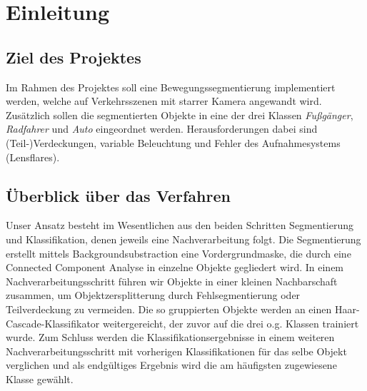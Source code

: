 \documentclass[conference]{IEEEtran}
\begin{document}

%
\IEEEpeerreviewmaketitle


\section{Einleitung}

 


\subsection{Ziel des Projektes}
Im Rahmen des Projektes soll eine Bewegungssegmentierung implementiert werden, welche auf Verkehrsszenen mit starrer Kamera angewandt wird. Zusätzlich sollen die segmentierten Objekte in eine der drei Klassen \textit{Fußgänger}, \textit{Radfahrer} und \textit{Auto} eingeordnet werden. Herausforderungen dabei sind (Teil-)Verdeckungen, variable Beleuchtung und Fehler des Aufnahmesystems (Lensflares).

\subsection{Überblick über das Verfahren}
Unser Ansatz besteht im Wesentlichen aus den beiden Schritten Segmentierung und Klassifikation, denen jeweils eine Nachverarbeitung folgt. Die Segmentierung erstellt mittels Backgroundsubstraction eine Vordergrundmaske, die durch eine Connected Component Analyse in einzelne Objekte gegliedert wird. In einem Nachverarbeitungsschritt führen wir Objekte in einer kleinen Nachbarschaft zusammen, um Objektzersplitterung durch Fehlsegmentierung oder Teilverdeckung zu vermeiden. Die so gruppierten Objekte werden an einen Haar-Cascade-Klassifikator weitergereicht, der zuvor auf die drei o.g. Klassen trainiert wurde. Zum Schluss werden die Klassifikationsergebnisse in einem weiteren Nachverarbeitungsschritt mit vorherigen Klassifikationen für das selbe Objekt verglichen und als endgültiges Ergebnis wird die am häufigsten zugewiesene Klasse gewählt.
\end{document}
